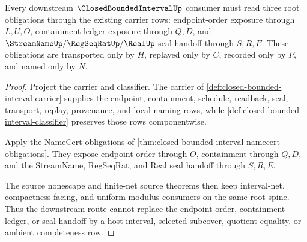 \begin{theorem}
\label{thm:closed-bounded-interval-root-obligation-spine}
Every downstream $\ClosedBoundedIntervalUp$ consumer must read three root obligations through the existing carrier rows: endpoint-order exposure through $L,U,O$, containment-ledger exposure through $Q,D$, and $\StreamNameUp/\RegSeqRatUp/\RealUp$ seal handoff through $S,R,E$. These obligations are transported only by $H$, replayed only by $C$, recorded only by $P$, and named only by $N$.
\end{theorem}
\begin{proof}
Project the carrier and classifier. The carrier of \autoref{def:closed-bounded-interval-carrier} supplies the endpoint, containment, schedule, readback, seal, transport, replay, provenance, and local naming rows, while \autoref{def:closed-bounded-interval-classifier} preserves those rows componentwise.

Apply the NameCert obligations of \autoref{thm:closed-bounded-interval-namecert-obligations}. They expose endpoint order through $O$, containment through $Q,D$, and the StreamName, RegSeqRat, and Real seal handoff through $S,R,E$.

The source nonescape and finite-net source theorems then keep interval-net, compactness-facing, and uniform-modulus consumers on the same root spine. Thus the downstream route cannot replace the endpoint order, containment ledger, or seal handoff by a host interval, selected subcover, quotient equality, or ambient completeness row.
\end{proof}


